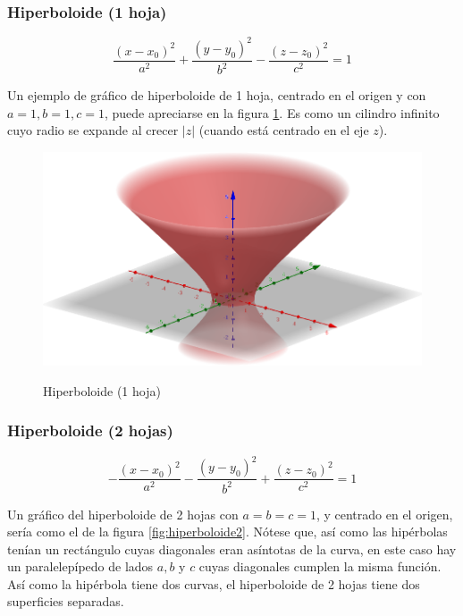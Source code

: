 \documentclass{article}
\begin{document}
\subsubsection{Hiperboloide (1 hoja)}

\begin{equation}
\frac{(x-x_0)^2}{a^2} + \frac{(y-y_0)^2}{b^2} - \frac{(z-z_0)^2}{c^2} = 1
\end{equation}

Un ejemplo de gráfico de hiperboloide de 1 hoja, centrado en el origen y con $a=1, b=1, c=1$, puede apreciarse en la figura \ref{fig:hiperboloide1}. Es como un cilindro infinito cuyo radio se expande al crecer $|z|$ (cuando está centrado en el eje $z$).

\begin{figure}[ht]
\caption{Hiperboloide (1 hoja)}
\includegraphics[scale=0.5]{img/teo_fig004_hiperboloide1.png} 
\centering
\label{fig:hiperboloide1}
\end{figure}

\subsubsection{Hiperboloide (2 hojas)}

\begin{equation}
-\frac{(x-x_0)^2}{a^2} - \frac{(y-y_0)^2}{b^2} + \frac{(z-z_0)^2}{c^2} = 1
\end{equation}

Un gráfico del hiperboloide de 2 hojas con $a = b = c =1$, y centrado en el origen, sería como el de la figura \ref{fig:hiperboloide2}. Nótese que, así como las hipérbolas tenían un rectángulo cuyas diagonales eran asíntotas de la curva, en este caso hay un paralelepípedo de lados $a, b$ y $c$ cuyas diagonales cumplen la misma función. Así como la hipérbola tiene dos curvas, el hiperboloide de 2 hojas tiene dos superficies separadas.
\end{document}
